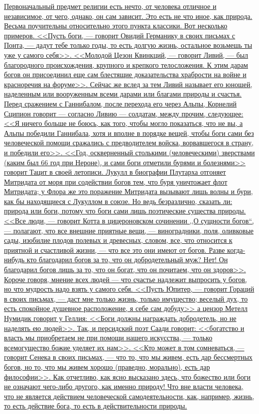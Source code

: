 \documentclass[12pt]{article}
\begin{document}
\hyperlink{b2}{Первоначальный предмет религии есть нечто, от человека отличное и независимое, от чего, однако, он сам зависит. Это есть не что иное, как природа. Весьма поучительны относительно этого пункта классики. Вот несколько примеров. <<Пусть боги, --- говорит Овидий Германику в своих письмах с Понта, --- дадут тебе только годы, то есть долгую жизнь, остальное возьмешь ты уже у самого себя>>. <<Молодой Цезон Квинкций, --- говорит Ливий, --- был благородного происхождения, крупного и крепкого телосложения. К этим дарам богов он присоединил еще сам блестящие доказательства храбрости на войне и красноречия на форуме>>. Сейчас же вслед за тем Ливий называет его юношей, наделенным или вооруженным всеми дарами или благами природы и счастья. Перед сражением с Ганнибалом, после перехода его через Альпы, Корнелий Сципион говорит --- согласно Ливию --- солдатам, между прочим, следующее: <<Я ничего больше не боюсь, как того, чтобы могло показаться, что не вы, а Альпы победили Ганнибала, хотя и вполне в порядке вещей, чтобы боги сами без человеческой помощи сражались с предводителем войска, ворвавшегося в страну, и победили его>>. <<Год, оскверненный столькими (человеческими) зверствами (каким был 66 год при Нероне), и сами боги отметили бурями и болезнями>>  говорит Тацит в своей летописи. Лукулл в биографии Плутарха отгоняет Митридата от моря при содействии богов тем, что буря уничтожает флот Митридата; у Флора же это поражение Митридата вызывают лишь волны и бури, как бы находящиеся с Лукуллом в союзе. Но ведь безразлично, сказать ли: природа или боги, потому что боги сами лишь поэтические существа природы. <<Все люди, --- говорит Котта в цицероновском сочинении ,,О сущности богов``, ---  полагают, что все внешние приятные вещи, --- виноградники, поля, оливковые сады, изобилие плодов полевых и древесных, словом, все, что относится к приятной и счастливой жизни, --- что все это они имеют от богов. Разве когда-нибудь кто благодарил богов за то, что он добродетельный муж? Нет! Он благодарил богов лишь за то, что он богат, что он почитаем, что он здоров>>. Короче говоря, мнение всех людей --- что счастье надлежит выпросить у богов, но что мудрость надо взять у самого себя. <<Пусть Юпитер, --- говорит Гораций в своих письмах, --- даст мне только жизнь, только имущество; веселый дух, то есть спокойное душевное расположение, я себе сам добуду>>  а цензор Метелл Нумидик говорит у Геллия: <<Боги должны награждать добродетель, но не наделять ею людей>>. Так, и персидский поэт Саади говорит: <<богатство и власть мы приобретаем не при помощи нашего искусства, --- только всемогущество божие уделяет их нам>>. <<Кто может в том сомневаться, --- говорит Сенека в своих письмах, --- что то, что мы живем, есть дар бессмертных богов, но то, что мы живем хорошо (праведно, морально), есть дар философии>>. Как отчетливо, как ясно высказано здесь, что божество или боги не означают чего-либо другого, как именно природу! Что вне власти человека, что не является действием человеческой самодеятельности, как, например, жизнь, то есть действие бога, то есть в действительности природы.} 
\end{document}
